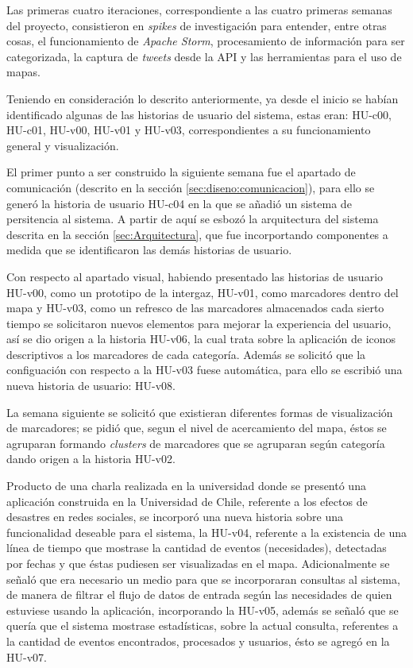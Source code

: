 Las primeras cuatro iteraciones, correspondiente a las cuatro primeras semanas del proyecto, consistieron en \textit{spikes} de investigación para entender, entre otras cosas, el funcionamiento de \textit{Apache Storm}, procesamiento de información para ser categorizada, la captura de \textit{tweets} desde la API y las herramientas para el uso de mapas. 

Teniendo en consideración lo descrito anteriormente, ya desde el inicio se habían identificado algunas de las historias de usuario del sistema, estas eran: HU-c00, HU-c01, HU-v00, HU-v01 y HU-v03, correspondientes a su funcionamiento general y visualización.

El primer punto a ser construido la siguiente semana fue el apartado de comunicación (descrito en la sección \ref{sec:diseno:comunicacion}), para ello se generó la historia de usuario HU-c04 en la que se añadió un sistema de persitencia al sistema. A partir de aquí se esbozó la arquitectura del sistema descrita en la sección \ref{sec:Arquitectura}, que fue incorportando componentes a medida que se identificaron las demás historias de usuario.

Con respecto al apartado visual, habiendo presentado las historias de usuario HU-v00, como un prototipo de la intergaz, HU-v01, como marcadores dentro del mapa y HU-v03, como un refresco de las marcadores almacenados cada sierto tiempo se solicitaron nuevos elementos para mejorar la experiencia del usuario, así se dio origen a la historia HU-v06, la cual trata sobre la aplicación de iconos descriptivos a los marcadores de cada categoría. Además se solicitó que la configuación con respecto a la HU-v03 fuese automática, para ello se escribió una nueva historia de usuario: HU-v08.

La semana siguiente se solicitó que existieran diferentes formas de visualización de marcadores; se pidió que, segun el nivel de acercamiento del mapa, éstos se agruparan formando \textit{clusters} de marcadores que se agruparan según categoría dando origen a la historia HU-v02.

Producto de una charla realizada en la universidad donde se presentó una aplicación construida en la Universidad de Chile, referente a los efectos de desastres en redes sociales, se incorporó una nueva historia sobre una funcionalidad deseable para el sistema, la HU-v04, referente a la existencia de una línea de tiempo que mostrase la cantidad de eventos (necesidades), detectadas por fechas y que éstas pudiesen ser visualizadas en el mapa. Adicionalmente se señaló que era necesario un medio para que se incorporaran consultas al sistema, de manera de filtrar el flujo de datos de entrada según las necesidades de quien estuviese usando la aplicación, incorporando la HU-v05, además se señaló que se quería que el sistema mostrase estadísticas, sobre la actual consulta, referentes a la cantidad de eventos encontrados, procesados y usuarios, ésto se agregó en la HU-v07.

